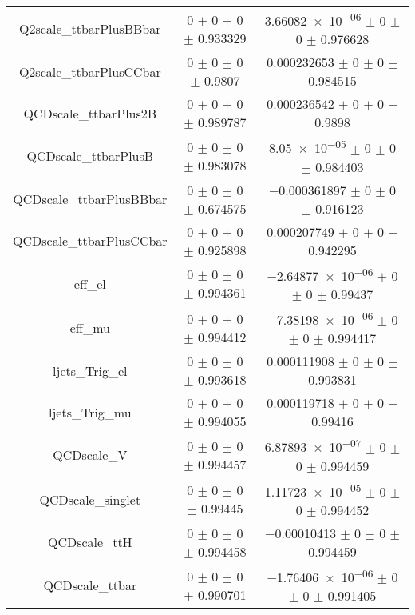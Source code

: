 \begin{table}
\begin{tabular}{ccc}
Q2scale\_ttbarPlusBBbar & \num{0} $\pm$ \num{0} $\pm$ \num{0} $\pm$ \num{0.933329} & \num{3.66082e-06} $\pm$ \num{0} $\pm$ \num{0} $\pm$ \num{0.976628}\\
Q2scale\_ttbarPlusCCbar & \num{0} $\pm$ \num{0} $\pm$ \num{0} $\pm$ \num{0.9807} & \num{0.000232653} $\pm$ \num{0} $\pm$ \num{0} $\pm$ \num{0.984515}\\
QCDscale\_ttbarPlus2B & \num{0} $\pm$ \num{0} $\pm$ \num{0} $\pm$ \num{0.989787} & \num{0.000236542} $\pm$ \num{0} $\pm$ \num{0} $\pm$ \num{0.9898}\\
QCDscale\_ttbarPlusB & \num{0} $\pm$ \num{0} $\pm$ \num{0} $\pm$ \num{0.983078} & \num{8.05e-05} $\pm$ \num{0} $\pm$ \num{0} $\pm$ \num{0.984403}\\
QCDscale\_ttbarPlusBBbar & \num{0} $\pm$ \num{0} $\pm$ \num{0} $\pm$ \num{0.674575} & \num{-0.000361897} $\pm$ \num{0} $\pm$ \num{0} $\pm$ \num{0.916123}\\
QCDscale\_ttbarPlusCCbar & \num{0} $\pm$ \num{0} $\pm$ \num{0} $\pm$ \num{0.925898} & \num{0.000207749} $\pm$ \num{0} $\pm$ \num{0} $\pm$ \num{0.942295}\\
eff\_el & \num{0} $\pm$ \num{0} $\pm$ \num{0} $\pm$ \num{0.994361} & \num{-2.64877e-06} $\pm$ \num{0} $\pm$ \num{0} $\pm$ \num{0.99437}\\
eff\_mu & \num{0} $\pm$ \num{0} $\pm$ \num{0} $\pm$ \num{0.994412} & \num{-7.38198e-06} $\pm$ \num{0} $\pm$ \num{0} $\pm$ \num{0.994417}\\
ljets\_Trig\_el & \num{0} $\pm$ \num{0} $\pm$ \num{0} $\pm$ \num{0.993618} & \num{0.000111908} $\pm$ \num{0} $\pm$ \num{0} $\pm$ \num{0.993831}\\
ljets\_Trig\_mu & \num{0} $\pm$ \num{0} $\pm$ \num{0} $\pm$ \num{0.994055} & \num{0.000119718} $\pm$ \num{0} $\pm$ \num{0} $\pm$ \num{0.99416}\\
QCDscale\_V & \num{0} $\pm$ \num{0} $\pm$ \num{0} $\pm$ \num{0.994457} & \num{6.87893e-07} $\pm$ \num{0} $\pm$ \num{0} $\pm$ \num{0.994459}\\
QCDscale\_singlet & \num{0} $\pm$ \num{0} $\pm$ \num{0} $\pm$ \num{0.99445} & \num{1.11723e-05} $\pm$ \num{0} $\pm$ \num{0} $\pm$ \num{0.994452}\\
QCDscale\_ttH & \num{0} $\pm$ \num{0} $\pm$ \num{0} $\pm$ \num{0.994458} & \num{-0.00010413} $\pm$ \num{0} $\pm$ \num{0} $\pm$ \num{0.994459}\\
QCDscale\_ttbar & \num{0} $\pm$ \num{0} $\pm$ \num{0} $\pm$ \num{0.990701} & \num{-1.76406e-06} $\pm$ \num{0} $\pm$ \num{0} $\pm$ \num{0.991405}\\

\end{tabular}
\end{table}
